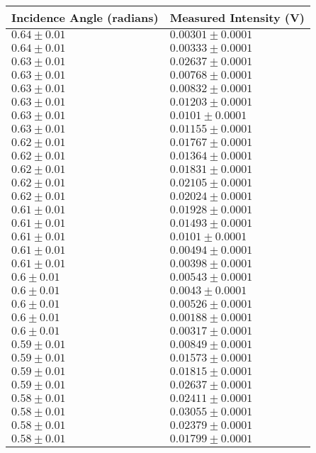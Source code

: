 \begin{tabular}{| p{} | p{} |}
\hline
Incidence Angle (radians) & Measured Intensity (V)\\
\hline
$0.64 \pm 0.01$ & $0.00301 \pm 0.0001$\\
$0.64 \pm 0.01$ & $0.00333 \pm 0.0001$\\
$0.63 \pm 0.01$ & $0.02637 \pm 0.0001$\\
$0.63 \pm 0.01$ & $0.00768 \pm 0.0001$\\
$0.63 \pm 0.01$ & $0.00832 \pm 0.0001$\\
$0.63 \pm 0.01$ & $0.01203 \pm 0.0001$\\
$0.63 \pm 0.01$ & $0.0101 \pm 0.0001$\\
$0.63 \pm 0.01$ & $0.01155 \pm 0.0001$\\
$0.62 \pm 0.01$ & $0.01767 \pm 0.0001$\\
$0.62 \pm 0.01$ & $0.01364 \pm 0.0001$\\
$0.62 \pm 0.01$ & $0.01831 \pm 0.0001$\\
$0.62 \pm 0.01$ & $0.02105 \pm 0.0001$\\
$0.62 \pm 0.01$ & $0.02024 \pm 0.0001$\\
$0.61 \pm 0.01$ & $0.01928 \pm 0.0001$\\
$0.61 \pm 0.01$ & $0.01493 \pm 0.0001$\\
$0.61 \pm 0.01$ & $0.0101 \pm 0.0001$\\
$0.61 \pm 0.01$ & $0.00494 \pm 0.0001$\\
$0.61 \pm 0.01$ & $0.00398 \pm 0.0001$\\
$0.6 \pm 0.01$ & $0.00543 \pm 0.0001$\\
$0.6 \pm 0.01$ & $0.0043 \pm 0.0001$\\
$0.6 \pm 0.01$ & $0.00526 \pm 0.0001$\\
$0.6 \pm 0.01$ & $0.00188 \pm 0.0001$\\
$0.6 \pm 0.01$ & $0.00317 \pm 0.0001$\\
$0.59 \pm 0.01$ & $0.00849 \pm 0.0001$\\
$0.59 \pm 0.01$ & $0.01573 \pm 0.0001$\\
$0.59 \pm 0.01$ & $0.01815 \pm 0.0001$\\
$0.59 \pm 0.01$ & $0.02637 \pm 0.0001$\\
$0.58 \pm 0.01$ & $0.02411 \pm 0.0001$\\
$0.58 \pm 0.01$ & $0.03055 \pm 0.0001$\\
$0.58 \pm 0.01$ & $0.02379 \pm 0.0001$\\
$0.58 \pm 0.01$ & $0.01799 \pm 0.0001$\\
\hline
\end{tabular}\hfill
